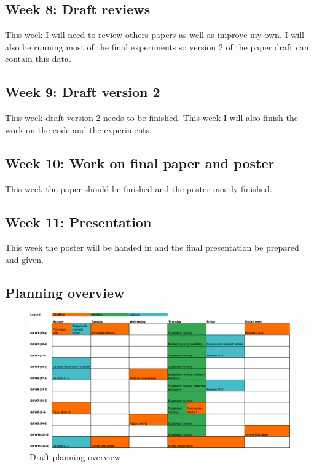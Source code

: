 \documentclass[english]{article}
\begin{document}
\subsection*{Week 8: Draft reviews}
This week I will need to review others papers as well as improve my own. I will also be running most of the final experiments so version 2 of the paper draft can contain this data.

\subsection*{Week 9: Draft version 2}
This week draft version 2 needs to be finished. This week I will also finish the work on the code and the experiments.

\subsection*{Week 10: Work on final paper and poster}
This week the paper should be finished and the poster mostly finished.

\subsection*{Week 11: Presentation}
This week the poster will be handed in and the final presentation be prepared and given.

\subsection*{Planning overview}
\begin{figure}[h]
	\includegraphics[width=\linewidth]{Planning}
	\centering
	\caption{Draft planning overview}
\end{figure}


\printbibliography

\end{document}
